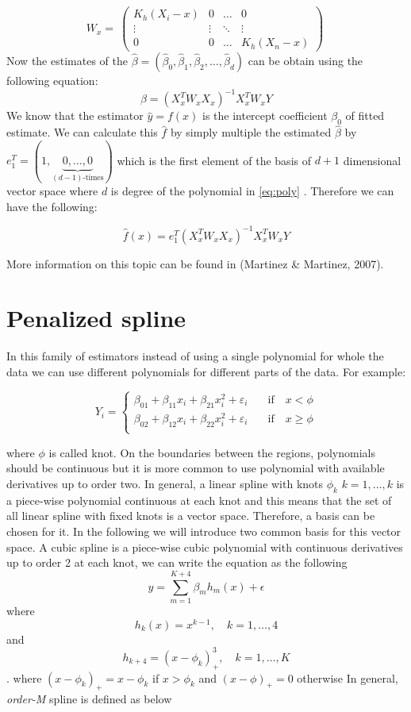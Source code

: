 \documentclass[12pt,twoside, a4paper]{reedthesis}
\begin{document}
\[W_x=\
 \begin{pmatrix}
  K_h(X_i-x) & 0 & \dots& 0 \\
  \vdots & \vdots &\ddots & \vdots \\
  0 & 0 & \dots & K_h(X_n-x)
 \end{pmatrix}
\
\]
Now the estimates of the \(\hat \beta=(\hat \beta_0,\hat \beta_1,\hat \beta_2,\dots,\hat \beta_d)\) can be obtain using the following equation:
\[\hat\beta=(X_x^TW_xX_x)^{-1}X_x^TW_xY\]
We know that the estimator \(\hat y=f(x)\) is the intercept coefficient \(\beta_0\) of fitted estimate. We can calculate this \(\hat f\) by simply multiple the estimated \(\hat\beta\)
by \(e_1^T=(1,\underbrace{0,\dots,0}_\text{$(d-1)$-times})\) which is the first element of the basis of \(d+1\) dimensional vector space where \(d\) is degree of the polynomial in \eqref{eq:poly} . Therefore we can have the following:

\[\hat f(x)= e_1^T(X_x^TW_xX_x)^{-1}X_x^TW_xY\]

More information on this topic can be found in (Martinez \& Martinez, 2007).

\hypertarget{penalized-spline}{%
\section{Penalized spline}\label{penalized-spline}}

In this family of estimators instead of using a single polynomial for whole the data we can use different polynomials for different parts of the data. For example:

\[   
Y_i = 
     \begin{cases}
     \beta_{01}+\beta_{11}x_i+\beta_{21}x_i^2+\varepsilon_i & \quad\text{if}\quad x<\phi  \\
       \beta_{02}+\beta_{12}x_i+\beta_{22}x_i^2+\varepsilon_i & \quad\text{if}\quad x\geq\phi \\
     \end{cases}
\]

where \(\phi\) is called knot. On the boundaries between the regions, polynomials should be continuous but it is more common to use polynomial with available derivatives up to order two. In general, a linear spline with knots \(\phi_k\) \(k=1,\dots,k\) is a piece-wise polynomial continuous at each knot and this means that the set of all linear spline with fixed knots is a vector space. Therefore, a basis can be chosen for it. In the following we will introduce two common basis for this vector space. A cubic spline is a piece-wise cubic polynomial with continuous derivatives up to order 2 at each knot, we can write the equation as the following
\[y=\sum^{K+4}_{m=1}\beta_mh_m(x)+\epsilon\]
where \[h_k(x)=x^{k-1},\quad k=1,\dots,4\] and \[h_{k+4}=(x-\phi_k)^3_+,\quad k=1,\dots,K\].
where \((x-\phi_k)_+=x-\phi_k\) if \(x>\phi_k\) and \((x-\phi)_+=0\) otherwise
In general, \emph{order-M} spline is defined as below
\end{document}
